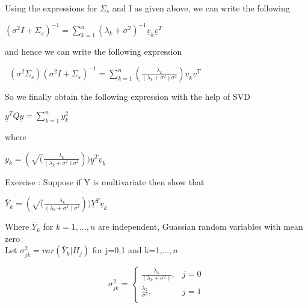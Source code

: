 \documentclass[12pt]{report}
\begin{document}
	\noindent Using the expressions for $ \Sigma_s$ and I as given above, we can write the following\\
	\begin{center}
		$ (\sigma^2I+\Sigma_s)^{-1}= \sum_{k=1}^{n}( \lambda_k+\sigma^2)^{-1}\underline{v}_k\underline{v}^T $\\
	\end{center}
	\noindent and hence we can write the following expression \\
	\begin{center}
		\ $ (\sigma^2\Sigma_s) (\sigma^2I+\Sigma_s)^{-1}=\sum_{k=1}^{n}(\frac{\lambda_k}{(\lambda_k+\sigma^2)\sigma^2})\underline{v}_k\underline{v}^T$\\
	\end{center}
	\noindent So we finally obtain the following expression with the help of SVD \\
	\begin{center}
		$\underline{y}^TQ\underline{y}=\sum_{k=1}^{n} y_k^{2}$\\
	\end{center}
	
	\noindent where\\
	\begin{center}
		$y_k=(\sqrt(\frac{\lambda_k}{(\lambda_k+\sigma^2)\sigma^2}))\underline{y}^T\underline{v}_k$\\
	\end{center}
	
	\noindent Exercise : Suppose if Y is multivariate then show that  \\
	\begin{center}
	\noindent $ \bar{Y}_k=(\sqrt(\frac{\lambda_k}{(\lambda_k+\sigma^2)\sigma^2}))\underline{Y}^T\underline{v}_k$
	\end{center}
  Where $\bar{Y}_k $  for $ k=1,\ldots,n$ are independent, Guassian random variables with mean zero \\
	
	\noindent Let $\sigma_{jk}^{2}=var(\bar{Y}_k|H_j)$ for j=0,1 and k=1,$\ldots,n$ 
	
	\begin{equation}
     \sigma_{jk}^{2} =
	\begin{cases}
	\frac{\lambda_k}{(\lambda_k+\sigma^2)} ,& j=0\\
	\frac{\lambda_k}{\sigma^2},& j=1\\
	\end{cases}
	\end{equation}
	
\end{document}
